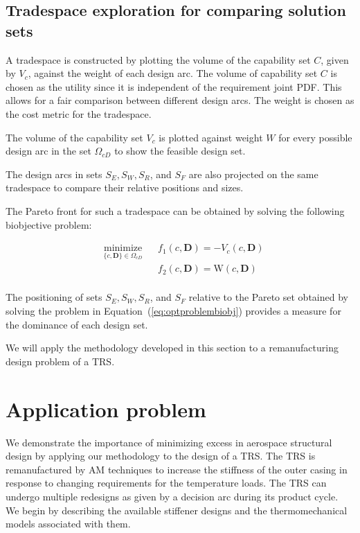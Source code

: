 \subsection{Tradespace exploration for comparing solution sets} \label{subsec:TSE}

A tradespace is constructed by plotting the volume of the capability set $C$, given by $V_c$, against the weight of each design arc. The volume of capability set $C$ is chosen as the utility since it is independent of the requirement joint \ac{PDF}. This allows for a fair comparison between different design arcs. The weight is chosen as the cost metric for the tradespace.

The volume of the capability set $V_c$ is plotted against weight $W$ for every possible design arc in the set $\Omega_{cD}$ to show the feasible design set.

The design arcs in sets $S_E,S_W,S_R$, and $S_F$ are also projected on the same tradespace to compare their relative positions and sizes.

The Pareto front for such a tradespace can be obtained by solving the following biobjective problem:

\begin{equation}
	\label{eq:optproblembiobj}
	\begin{aligned}
		& \underset{\{c,\mathbf{D}\}\in\Omega_{cD}}{\text{minimize}}
		& & {f_1}(c,\mathbf{D}) = -V_c(c,\mathbf{D})\\
		& & & {f_2}(c,\mathbf{D}) = \textrm{W}\left(c,\mathbf{D}\right)\\
	\end{aligned}
\end{equation}

The positioning of sets $S_E,S_W,S_R$, and $S_F$ relative to the Pareto set obtained by solving the problem in Equation~(\ref{eq:optproblembiobj}) provides a measure for the dominance of each design set.

We will apply the methodology developed in this section to a remanufacturing design problem of a \ac{TRS}.

\section{Application problem} \label{sec:TSEcasestudy}

We demonstrate the importance of minimizing excess in aerospace structural design by applying our methodology to the design of a \acf{TRS}. The \ac{TRS} is remanufactured by \ac{AM} techniques to increase the stiffness of the outer casing in response to changing requirements for the temperature loads. The \ac{TRS} can undergo multiple redesigns as given by a decision arc during its product cycle. We begin by describing the available stiffener designs and the thermomechanical models associated with them.


